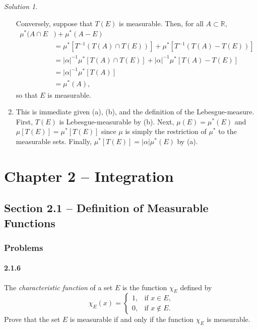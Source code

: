 \documentclass{report}
\newcommand{\bb}[1]{\mathbb{#1}}
\theoremstyle{remark}
\newtheorem*{solution}{Solution}
\begin{document}
\begin{solution}
\begin{enumerate}[label=(\alph*)]
      Conversely, suppose that $T(E)$ is measurable. Then, for all $A \subset \bb R$,
      \begin{equation*}
        \begin{split}
          \mu^*(A \cap E&) + \mu^*(A - E) \\
          &= \mu^*[T^{-1}(T(A) \cap T(E))] + \mu^*[T^{-1}(T(A) - T(E))] \\
          &= |\alpha|^{-1} \mu^*[T(A) \cap T(E)] + |\alpha|^{-1} \mu^*[T(A) - T(E)] \\
          &= |\alpha|^{-1} \mu^*[T(A)] \\
          &= \mu^*(A),
        \end{split}
      \end{equation*}
      so that $E$ is measurable.

    \item This is immediate given (a), (b), and the definition of the Lebesgue-measure. First, $T(E)$ is Lebesgue-measurable by (b). Next, $\mu(E) = \mu^*(E)$ and $\mu[T(E)] = \mu^*[T(E)]$ since $\mu$ is simply the restriction of $\mu^*$ to the measurable sets. Finally, $\mu^*[T(E)] = |\alpha| \mu^*(E)$ by (a).
  \end{enumerate}
\end{solution}

\chapter*{Chapter 2 -- Integration}

\section*{Section 2.1 -- Definition of Measurable Functions}

\subsection*{Problems}

\subsubsection*{2.1.6}
The \emph{characteristic function} of a set $E$ is the function $\chi_E$ defined by
\begin{equation*}
  \chi_E(x) =
  \begin{cases}
    1, & \text{if $x \in E$,} \\
    0, & \text{if $x \notin E$.}
  \end{cases}
\end{equation*}
Prove that the set $E$ is measurable if and only if the function $\chi_E$ is measurable.
\end{document}
